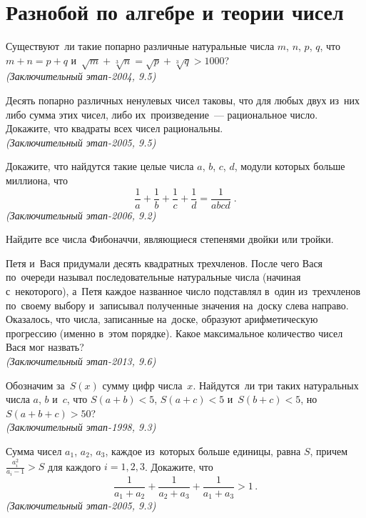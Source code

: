 
\section*{Разнобой по алгебре и теории чисел}


\begin{problems}

\item
Существуют~ли такие попарно различные натуральные числа $m$, $n$, $p$, $q$, что
$m + n = p + q$ и~$\sqrt{m} + \sqrt[3]{n} = \sqrt{p} + \sqrt[3]{q} > 1000$?
\\\emph{(Заключительный этап-2004, 9.5)}

\item
Десять попарно различных ненулевых чисел таковы, что для любых двух из~них либо
сумма этих чисел, либо их~произведение~--- рациональное число.
Докажите, что квадраты всех чисел рациональны.
\\\emph{(Заключительный этап-2005, 9.5)}

\item
Докажите, что найдутся такие целые числа $a$, $b$, $c$, $d$, модули которых
больше миллиона, что
\[
    \frac{1}{a} + \frac{1}{b} + \frac{1}{c} + \frac{1}{d}
=
    \frac{1}{a b c d}
\; . \]
\emph{(Заключительный этап-2006, 9.2)}

\item
Найдите все числа Фибоначчи, являющиеся степенями двойки или тройки.

\item
Петя и~Вася придумали десять квадратных трехчленов.
После чего Вася по~очереди называл последовательные натуральные числа
(начиная с~некоторого), а~Петя каждое названное число подставлял в~один
из~трехчленов по~своему выбору и~записывал полученные значения на~доску слева
направо.
Оказалось, что числа, записанные на~доске, образуют арифметическую прогрессию
(именно в~этом порядке).
Какое максимальное количество чисел Вася мог назвать?
\\\emph{(Заключительный этап-2013, 9.6)}

\item
Обозначим за~$S(x)$ сумму цифр числа~$x$.
Найдутся~ли три таких натуральных числа $a$, $b$ и~$c$, что
$S(a + b) < 5$, $S(a + c) < 5$ и~$S(b + c) < 5$, но~$S(a + b + c) > 50$?
\\\emph{(Заключительный этап-1998, 9.3)}

\item
Сумма чисел $a_1$, $a_2$, $a_3$, каждое из~которых больше единицы, равна $S$,
причем $\frac{a_i^2}{a_i - 1} > S$ для каждого $i = 1, 2, 3$.
Докажите, что
\[
    \frac{1}{a_1 + a_2} + \frac{1}{a_2 + a_3} + \frac{1}{a_1 + a_3}
>
    1
\, . \]
\emph{(Заключительный этап-2005, 9.3)}

\end{problems}


